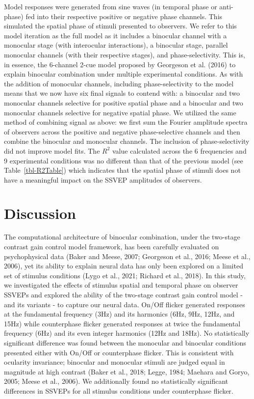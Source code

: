 \documentclass[
  12pt,
]{article}
\begin{document}
Model responses were generated from sine waves (in temporal phase or
anti-phase) fed into their respective positive or negative phase
channels. This simulated the spatial phase of stimuli presented to
observers. We refer to this model iteration as the full model as it
includes a binocular channel with a monocular stage (with interocular
interactions), a binocular stage, parallel monocular channels (with
their respective stages), and phase-selectivity. This is, in essence,
the 6-channel 2-cue model proposed by Georgeson et al. (2016) to explain
binocular combination under multiple experimental conditions. As with
the addition of monocular channels, including phase-selectivity to the
model means that we now have six final signals to contend with: a
binocular and two monocular channels selective for positive spatial
phase and a binocular and two monocular channels selective for negative
spatial phase. We utilized the same method of combining signal as above:
we first sum the Fourier amplitude spectra of observers across the
positive and negative phase-selective channels and then combine the
binocular and monocular channels. The inclusion of phase-selectivity did
not improve model fits. The \(R^2\) value calculated across the 6
frequencies and 9 experimental conditions was no different than that of
the previous model (see Table~\ref{tbl-R2Table}) which indicates that
the spatial phase of stimuli does not have a meaningful impact on the
SSVEP amplitudes of observers.

\section{Discussion}\label{discussion}

The computational architecture of binocular combination, under the
two-stage contrast gain control model framework, has been carefully
evaluated on psychophysical data (Baker and Meese, 2007; Georgeson et
al., 2016; Meese et al., 2006), yet its ability to explain neural data
has only been explored on a limited set of stimulus conditions (Lygo et
al., 2021; Richard et al., 2018). In this study, we investigated the
effects of stimulus spatial and temporal phase on observer SSVEPs and
explored the ability of the two-stage contrast gain control model - and
its variants - to capture our neural data. On/Off flicker generated
responses at the fundamental frequency (3Hz) and its harmonics (6Hz,
9Hz, 12Hz, and 15Hz) while counterphase flicker generated responses at
twice the fundamental frequency (6Hz) and its even integer harmonics
(12Hz and 18Hz). No statistically significant difference was found
between the monocular and binocular conditions presented either with
On/Off or counterphase flicker. This is consistent with ocularity
invariance; binocular and monocular stimuli are judged equal in
magnitude at high contrast (Baker et al., 2018; Legge, 1984; Maehara and
Goryo, 2005; Meese et al., 2006). We additionally found no statistically
significant differences in SSVEPs for all stimulus conditions under
counterphase flicker.
\end{document}
